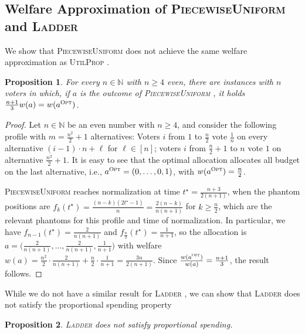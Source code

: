 \documentclass[11pt]{article}
\newcommand{\N}{\mathbb{N}}
\newcommand{\opt}{\textsc{Opt}}
\newcommand{\Ladder}{\textsc{Ladder} }
\newcommand{\PiecewiseUniform}{\textsc{PiecewiseUniform} }
\newcommand{\UtP}{\textsc{UtilProp} }
\newtheorem{proposition}{Proposition}
\begin{document}
    





\subsection{Welfare Approximation of \PiecewiseUniform and \Ladder}\label{app:lb-im-pu}

We show that \PiecewiseUniform does not achieve the same welfare approximation as \UtP.

\begin{proposition}
    For every $n\in \N$ with $n\geq 4$ even, there are instances with $n$ voters in which, if $a$ is the outcome of \PiecewiseUniform, it holds $\frac{n+1}{3} w(a) = w(a^\opt)$.
\end{proposition}

\begin{proof}
    Let $n\in \N$ be an even number with $n\geq 4$, and consider the following profile with $m=\frac{n^2}{2}+1$ alternatives:
    Voters $i$ from $1$ to $\frac{n}{2}$ vote $\frac{1}{n}$ on every alternative 
    $ (i-1) \cdot n + \ell$ for $\ell\in [n]$;
    voters $i$ from $\frac{n}{2}+1$ to $n$ vote $1$ on alternative $\frac{n^2}{2}+1$.
    It is easy to see that the optimal allocation allocates all budget on the last alternative, i.e., $a^\opt=(0,\ldots,0,1)$, with $w(a^\opt)=\frac{n}{2}$.


    \PiecewiseUniform reaches normalization at time $t^\star=\frac{n+3}{2(n+1)}$, when the phantom positions are $f_k(t^\star)=\frac{(n-k)(2t^\star-1)}{n} = \frac{2(n-k)}{n(n+1)}$ for $k\geq \frac{n}{2}$, which are the relevant phantoms for this profile and time of normalization.
    In particular, we have $f_{n-1}(t^\star)=\frac{2}{n(n+1)}$ and $f_{\frac{n}{2}}(t^\star)=\frac{1}{n+1}$, so the allocation is $a=\big(\frac{2}{n(n+1)},\ldots,\frac{2}{n(n+1)},\frac{1}{n+1}\big)$ with welfare $w(a)=\frac{n^2}{2}\cdot \frac{2}{n(n+1)} + \frac{n}{2} \cdot \frac{1}{n+1} = \frac{3n}{2(n+1)}$.
    Since $\frac{w(a^\opt)}{w(a)}=\frac{n+1}{3}$, the result follows.

\end{proof}


While we do not have a similar result for \Ladder, we can show that \Ladder does not satisfy the proportional spending property

\begin{proposition}
    \Ladder does not satisfy proportional spending.
\end{proposition}
\end{document}
